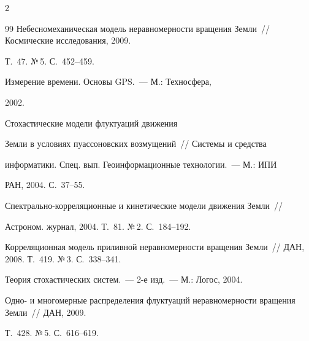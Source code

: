 \begin{multicols}{2}
{{\begin{thebibliography}{99}
Небесномеханическая модель неравномерности вращения Земли~// Космические исследования, 2009. 


Т.~47. №\,5. С.~452--459.










 Измерение времени. Основы GPS.~--- М.: Техносфера,


2002.







 Стохастические модели флуктуаций движения


Земли в условиях пуассоновских возмущений~// Системы и средства


информатики. Спец. вып. Геоинформационные технологии.~--- М.: ИПИ


РАН, 2004. С.~37--55.









Спект\-раль\-но-кор\-ре\-ля\-ци\-он\-ные и кинетические модели движения Земли~// 


Астроном. журнал, 2004. Т.~81. №\,2. С.~184--192.









Корреляционная модель приливной неравномерности вращения Земли~// ДАН, 2008. Т.~419. №\,3. С.~338--341.









Теория стохастических сис\-тем.~--- 2-е изд.~--- М.: Логос, 2004.









Одно- и многомерные распределения флуктуаций неравномерности вращения Земли~// ДАН, 2009. 


Т.~428. №\,5. С.~616--619.






\end{thebibliography}}}
\end{multicols}
